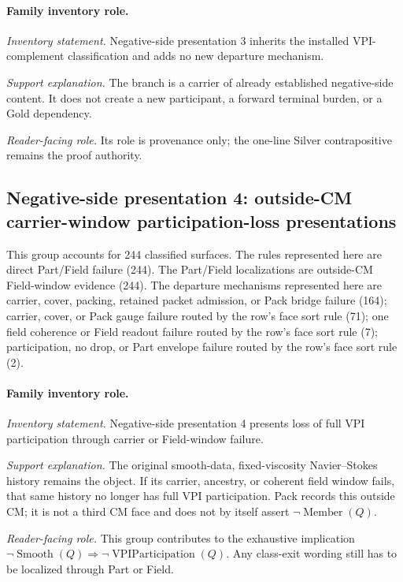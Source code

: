 \paragraph{Family inventory role.}
\emph{Inventory statement.} Negative-side presentation 3 inherits the installed VPI-complement classification and adds no new departure mechanism.

\emph{Support explanation.} The branch is a carrier of already established negative-side content. It does not create a new participant, a forward terminal burden, or a Gold dependency.

\emph{Reader-facing role.} Its role is provenance only; the one-line Silver contrapositive remains the proof authority.

\subsection{Negative-side presentation 4: outside-CM carrier-window participation-loss presentations}
This group accounts for 244 classified surfaces. The rules represented here are direct Part/Field failure (244). The Part/Field localizations are outside-CM Field-window evidence (244). The departure mechanisms represented here are carrier, cover, packing, retained packet admission, or Pack bridge failure (164); carrier, cover, or Pack gauge failure routed by the row's face sort rule (71); one field coherence or Field readout failure routed by the row's face sort rule (7); participation, no drop, or Part envelope failure routed by the row's face sort rule (2).

\paragraph{Family inventory role.}
\emph{Inventory statement.} Negative-side presentation 4 presents loss of full VPI participation through carrier or Field-window failure.

\emph{Support explanation.} The original smooth-data, fixed-viscosity Navier--Stokes history remains the object. If its carrier, ancestry, or coherent field window fails, that same history no longer has full VPI participation. Pack records this outside CM; it is not a third CM face and does not by itself assert \(\neg\operatorname{Member}(Q)\).

\emph{Reader-facing role.} This group contributes to the exhaustive implication \(\neg\operatorname{Smooth}(Q)\Rightarrow\neg\operatorname{VPIParticipation}(Q)\). Any class-exit wording still has to be localized through Part or Field.

